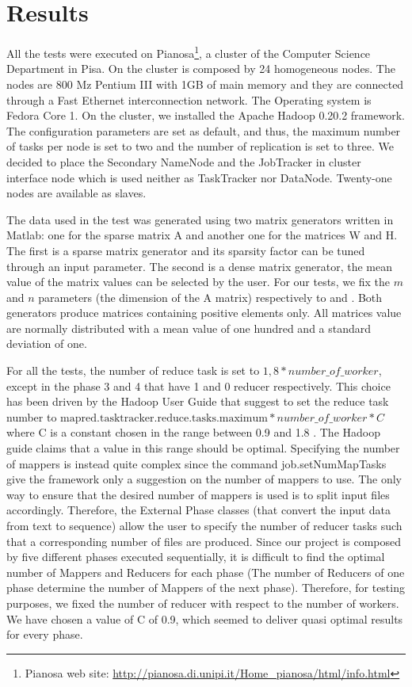 \section{Results}
\label{sec:results}

 All the tests were executed on Pianosa\footnote{Pianosa web site: \url{http://pianosa.di.unipi.it/Home_pianosa/html/info.html}}, a cluster of the Computer Science Department in Pisa. 
On the cluster is composed by 24 homogeneous nodes. The nodes are 800 Mz Pentium III with 1GB of main memory and they are connected through a Fast Ethernet interconnection network. 
The Operating system is Fedora Core 1. 
On the cluster, we installed the Apache Hadoop 0.20.2 framework. 
The configuration parameters are set as default, and thus, the maximum number of tasks per node is set to two and the number of replication is set to three. 
We decided to place the Secondary NameNode and the JobTracker in cluster interface node which is used neither as TaskTracker nor DataNode.
Twenty-one nodes are available as slaves.

The data used in the test was generated using two matrix generators written in Matlab: one for the sparse matrix A and another one for the matrices W and H. 
The first is a sparse matrix generator and its sparsity factor can be tuned through an input parameter. 
The second is a dense matrix generator, the mean value of the matrix values can be selected by the user. 
For our tests, we fix the $m$ and $n$ parameters (the dimension of the A matrix) respectively to  and .
Both generators produce matrices containing positive elements only.
All matrices value are normally distributed with a mean value of one hundred and a standard deviation of one.

For all the tests, the number of reduce task is set to $ 1,8 * number\_of\_worker$, except in the phase 3 and 4 that have 1 and 0 reducer respectively.
This choice has been driven by the Hadoop User Guide that suggest to set the reduce task number to 
$ \text{mapred.tasktracker.reduce.tasks.maximum} * number\_of\_worker * C $where C is a constant chosen in the range between 0.9 and 1.8 \cite{numeroReducer}. 
The Hadoop guide claims that a value in this range should be optimal.
Specifying the number of mappers is instead quite complex since the command job.setNumMapTasks give the framework only a suggestion on the number of mappers to use.
The only way to ensure that the desired number of mappers is used is to split input files accordingly. 
Therefore, the External Phase classes (that convert the input data from text to sequence) allow the user to specify the number of reducer tasks such that a corresponding number of files are produced.
Since our project is composed by five different phases executed sequentially, it is difficult to find the optimal number of Mappers and Reducers for each phase (The number of Reducers of one phase determine the number of Mappers of the next phase). 
Therefore, for testing purposes, we fixed the number of reducer with respect to the number of workers.
We have chosen a value of C of 0.9, which seemed to deliver quasi optimal results for every phase.

